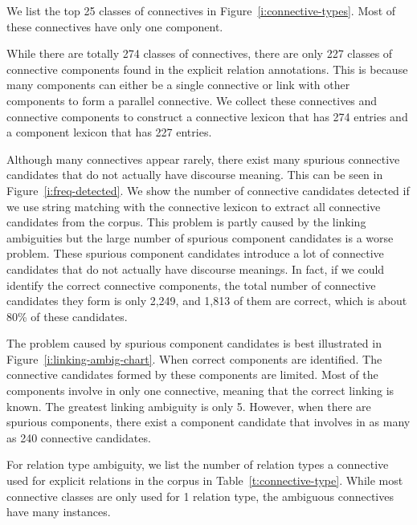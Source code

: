 




We list the top 25 classes of connectives in Figure~\ref{i:connective-types}.
Most of these connectives have only one component.



While there are totally 274 classes of connectives, there are only 227 classes
of connective components found in the explicit relation annotations. This
is because many components can either be a single connective or link
with other components to form a parallel connective. We collect these
connectives and connective components to construct a connective lexicon
that has 274 entries and a component lexicon that has 227 entries.


Although many connectives appear rarely, there exist many spurious connective
candidates that do not actually have discourse meaning. This can be seen in
Figure~\ref{i:freq-detected}. We show the number of connective candidates
detected if we use string matching with the connective lexicon to extract
all connective candidates from the corpus. This problem is partly caused by the linking
ambiguities but the large number of spurious component candidates is a worse problem.
These spurious component candidates introduce a lot of connective candidates that
do not actually have discourse meanings. In fact, if we could identify the correct
connective components, the total number of connective candidates they form
is only 2,249, and 1,813 of them are correct, which is about 80\% of these candidates.



The problem caused by spurious component candidates is best illustrated in
Figure~\ref{i:linking-ambig-chart}. When correct components are identified.
The connective candidates formed by these components are limited.
Most of the components involve in only one connective, meaning that the correct linking
is known. The greatest linking ambiguity is only 5. However, when there are
spurious components, there exist a component candidate that involves in as many
as 240 connective candidates.



For relation type ambiguity, we list the number of relation types a
connective used for explicit relations in the corpus in Table~\ref{t:connective-type}.
While most connective classes are only used for 1 relation type,
the ambiguous connectives have many instances.

